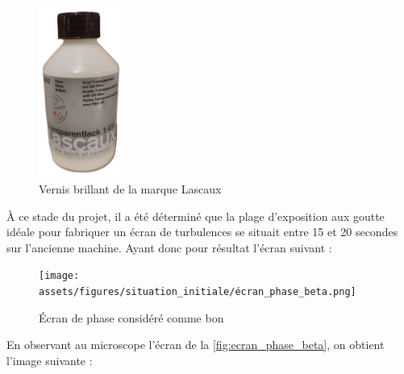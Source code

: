 \begin{figure}[H]
  \centering
  \includegraphics[width = 0.25\textwidth]{assets/figures/situation_initiale/Lascaux_vernis_brillant.png}
  \caption{Vernis brillant de la marque Lascaux}
\end{figure}

À ce stade du projet, il a été déterminé que la plage d'exposition aux goutte idéale pour fabriquer un écran de turbulences se situait entre 15 et 20 secondes sur l'ancienne machine.\footnotemark
Ayant donc pour résultat l'écran suivant :
\begin{figure}[H]
  \centering
  \texttt{[image: assets/figures/situation\_initiale/écran\_phase\_beta.png]}
  \caption{Écran de phase considéré comme bon}\label{fig:ecran_phase_beta}
\end{figure}


\newpage

En observant au microscope l'écran de la \autoref{fig:ecran_phase_beta}, on obtient l'image suivante :

